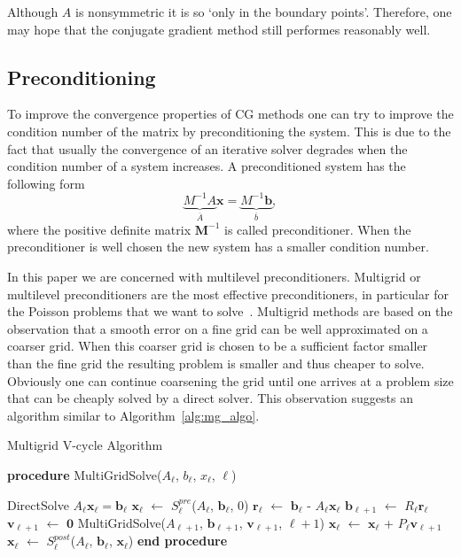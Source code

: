 Although $A$ is nonsymmetric it is so `only in the boundary points'.
Therefore, one may hope that the conjugate gradient method still
performes reasonably well.

\subsection{Preconditioning}

To improve the convergence properties of CG methods one can try to
improve the condition number of the matrix by preconditioning the
system.  This is due to the fact that usually the convergence of an
iterative solver degrades when the condition number of a system
increases.  A preconditioned system has the following form
\begin{equation*}
  \underbrace{{M}^{-1}{A}}_{\overline{{A}}}
  \mathbf{x} =
  \underbrace{{M}^{-1}\mathbf{b}}_{\overline{{b}}},
\end{equation*}
where the positive definite matrix $\mathbf{M}^{-1}$ is called
preconditioner.  When the preconditioner is well chosen the new system
has a smaller condition number.

In this paper we are concerned with multilevel preconditioners.
Multigrid or multilevel preconditioners are the most effective
preconditioners, in particular for the Poisson problems that we want to
solve~\cite{hack:85,tros:00}.  Multigrid methods are based on the
observation that a smooth error on a fine grid can be well approximated
on a coarser grid.  When this coarser grid is chosen to be a sufficient
factor smaller than the fine grid the resulting problem is smaller and
thus cheaper to solve.  Obviously one can continue coarsening the grid
until one arrives at a problem size that can be cheaply solved by a
direct solver.  This observation suggests an algorithm similar to
Algorithm~\ref{alg:mg_algo}.

\begin{algorithm}
  \caption{Multigrid V-cycle Algorithm} \label{alg:mg_algo}
  \begin{algorithmic}[1]
    \STATE \textbf{procedure} MultiGridSolve($A_\ell$, $b_\ell$, $x_\ell$, $\ell$)
    
    \STATE DirectSolve $A_\ell \mathbf{x}_\ell = \mathbf{b}_\ell$
    \ELSE
    \STATE $\mathbf{x}_\ell$ $\leftarrow$ $S^{pre}_\ell$($A_\ell$, $\mathbf{b}_\ell$, $0$)
    \STATE $\mathbf{r}_\ell$ $\leftarrow$ $\mathbf{b}_\ell$ - $A_\ell
    \mathbf{x}_\ell$ 
    \STATE $\mathbf{b}_{\ell+1}$ $\leftarrow$ $R_\ell \mathbf{r}_\ell$
    \STATE $\mathbf{v}_{\ell+1}$ $\leftarrow$ $\mathbf{0}$
    \STATE MultiGridSolve($A_{\ell+1}$, $\mathbf{b}_{\ell+1}$,
    $\mathbf{v}_{\ell+1}$, $\ell+1$) 
    \STATE $\mathbf{x}_\ell$ $\leftarrow$ $\mathbf{x}_\ell$ + $P_\ell
    \mathbf{v}_{\ell+1}$  
    \STATE $\mathbf{x}_\ell$ $\leftarrow$ $S^{post}_\ell$($A_\ell$,
    $\mathbf{b}_\ell$, $\mathbf{x}_\ell$) 
    \ENDIF
    \STATE \textbf{end procedure}
  \end{algorithmic}
\end{algorithm}

